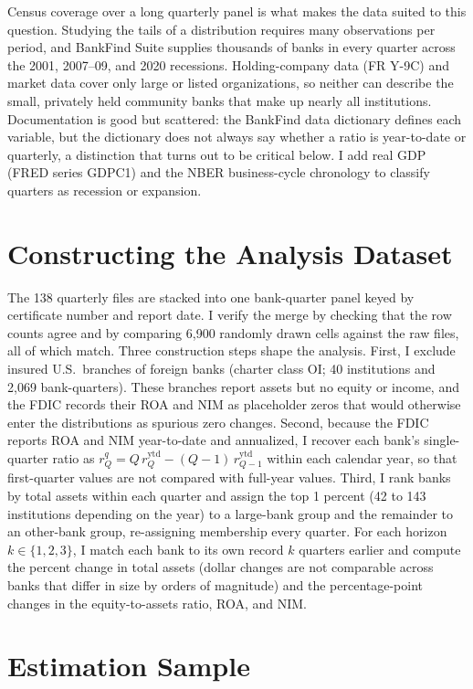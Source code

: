 \documentclass[11pt]{article}
\begin{document}
Census coverage over a long quarterly panel is what makes the data suited to this question. Studying the tails of a distribution requires many observations per period, and BankFind Suite supplies thousands of banks in every quarter across the 2001, 2007--09, and 2020 recessions. Holding-company data (FR Y-9C) and market data cover only large or listed organizations, so neither can describe the small, privately held community banks that make up nearly all institutions. Documentation is good but scattered: the BankFind data dictionary defines each variable, but the dictionary does not always say whether a ratio is year-to-date or quarterly, a distinction that turns out to be critical below. I add real GDP (FRED series GDPC1) and the NBER business-cycle chronology to classify quarters as recession or expansion.

\section*{Constructing the Analysis Dataset}

The 138 quarterly files are stacked into one bank-quarter panel keyed by certificate number and report date. I verify the merge by checking that the row counts agree and by comparing 6{,}900 randomly drawn cells against the raw files, all of which match. Three construction steps shape the analysis. First, I exclude insured U.S.\ branches of foreign banks (charter class OI; 40 institutions and 2{,}069 bank-quarters). These branches report assets but no equity or income, and the FDIC records their ROA and NIM as placeholder zeros that would otherwise enter the distributions as spurious zero changes. Second, because the FDIC reports ROA and NIM year-to-date and annualized, I recover each bank's single-quarter ratio as $r^{q}_{Q} = Q\, r^{\mathrm{ytd}}_{Q} - (Q-1)\, r^{\mathrm{ytd}}_{Q-1}$ within each calendar year, so that first-quarter values are not compared with full-year values. Third, I rank banks by total assets within each quarter and assign the top 1 percent (42 to 143 institutions depending on the year) to a large-bank group and the remainder to an other-bank group, re-assigning membership every quarter. For each horizon $k\in\{1,2,3\}$, I match each bank to its own record $k$ quarters earlier and compute the percent change in total assets (dollar changes are not comparable across banks that differ in size by orders of magnitude) and the percentage-point changes in the equity-to-assets ratio, ROA, and NIM.

\section*{Estimation Sample}
\end{document}
